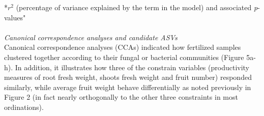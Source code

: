 \documentclass[11pt,]{article}
\begin{document}
*\(r^2\) (percentage of variance explained by the term in the model) and
associated \emph{p}-values" ~\\
\hspace*{0.333em}\\
\emph{Canonical correspondence analyses and candidate ASVs}\\
Canonical correspondence analyses (CCAs) indicated how fertilized
samples clustered together according to their fungal or bacterial
communities (Figure 5a-h). In addition, it illustrates how three of the
constrain variables (productivity measures of root fresh weight, shoots
fresh weight and fruit number) responded similarly, while average fruit
weight behave differentially as noted previously in Figure 2 (in fact
nearly orthogonally to the other three constraints in most
ordinations).\\
\hspace*{0.333em}\\
\end{document}
